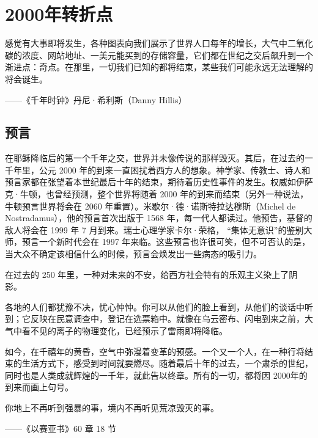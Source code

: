 \chapter[人类社会第四个阶段]{2000年转折点}

\begin{tcolorbox}
感觉有大事即将发生，各种图表向我们展示了世界人口每年的增长，大气中二氧化碳的浓度、网站地址、一美元能买到的存储容量，它们都在世纪之交后飙升到一个渐进点：奇点。在那里，一切我们已知的都将结束，某些我们可能永远无法理解的将会诞生。

\begin{flushright}
——《千年时钟》丹尼·希利斯（Danny Hillis）
\end{flushright}

\end{tcolorbox}


\section{预言}
在耶稣降临后的第一个千年之交，世界并未像传说的那样毁灭。其后，在过去的一千年里，公元 2000 年的到来一直困扰着西方人的想象。神学家、传教士、诗人和预言家都在张望着本世纪最后十年的结束，期待着历史性事件的发生。权威如伊萨克·牛顿，也曾经预测，整个世界将随着 2000 年的到来而结束（另外一种说法，牛顿预言世界将会在 2060 年重置）。米歇尔·德·诺斯特拉达穆斯（Michel de Nostradamus），他的预言首次出版于 1568 年，每一代人都读过。他预告，基督的敌人将会在 1999 年 7 月到来。瑞士心理学家卡尔·荣格， “集体无意识”的鉴别大师，预言一个新时代会在 1997 年来临。这些预言也许很可笑，但不可否认的是，当大众不确定该相信什么的时候，预言会焕发出一些病态的吸引力。


在过去的 250 年里，一种对未来的不安，给西方社会特有的乐观主义染上了阴影。


各地的人们都犹豫不决，忧心忡忡。你可以从他们的脸上看到，从他们的谈话中听到；它反映在民意调查中，登记在选票箱中。就像在乌云密布、闪电到来之前，大气中看不见的离子的物理变化，已经预示了雷雨即将降临。


如今，在千禧年的黄昏，空气中弥漫着变革的预感。一个又一个人，在一种行将结束的生活方式下，感受到时间就要燃尽。随着最后十年的过去，一个肃杀的世纪，同时也是人类成就辉煌的一千年，就此告以终章。所有的一切，都将因 2000年的到来而画上句号。



\begin{tcolorbox}
你地上不再听到强暴的事，境内不再听见荒凉毁灭的事。
\begin{flushright}
——《以赛亚书》60 章 18 节
\end{flushright}
\end{tcolorbox}

